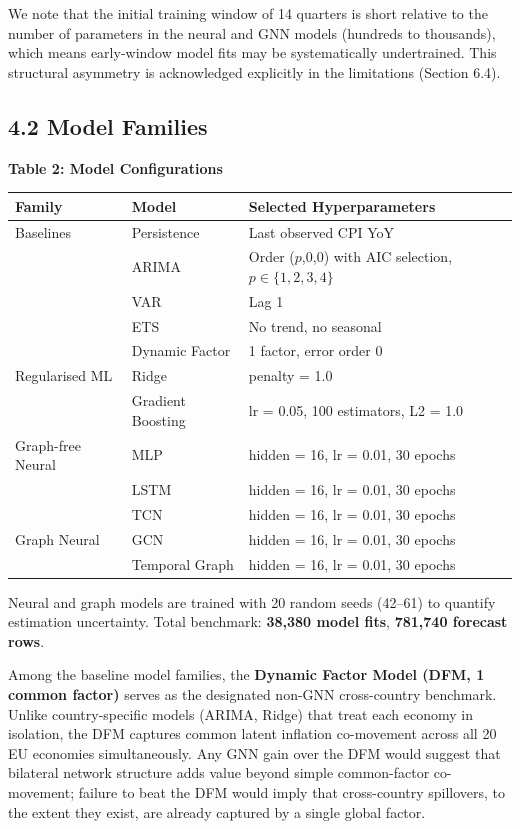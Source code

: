 \documentclass[
]{article}
\newcounter{none} %
\begin{document}
We note that the initial training window of 14 quarters is short
relative to the number of parameters in the neural and GNN models
(hundreds to thousands), which means early-window model fits may be
systematically undertrained. This structural asymmetry is acknowledged
explicitly in the limitations (Section 6.4).

\subsection{4.2 Model Families}\label{model-families}

\textbf{Table 2: Model Configurations}

{\def\LTcaptype{none} %
\begin{longtable}[]{@{}lll@{}}
\toprule\noalign{}
Family & Model & Selected Hyperparameters \\
\midrule\noalign{}
\endhead
\bottomrule\noalign{}
\endlastfoot
Baselines & Persistence & Last observed CPI YoY \\
& ARIMA & Order ($p$,0,0) with AIC selection, $p \in \{1,2,3,4\}$ \\
& VAR & Lag 1 \\
& ETS & No trend, no seasonal \\
& Dynamic Factor & 1 factor, error order 0 \\
Regularised ML & Ridge & penalty = 1.0 \\
& Gradient Boosting & lr = 0.05, 100 estimators, L2 = 1.0 \\
Graph-free Neural & MLP & hidden = 16, lr = 0.01, 30 epochs \\
& LSTM & hidden = 16, lr = 0.01, 30 epochs \\
& TCN & hidden = 16, lr = 0.01, 30 epochs \\
Graph Neural & GCN & hidden = 16, lr = 0.01, 30 epochs \\
& Temporal Graph & hidden = 16, lr = 0.01, 30 epochs \\
\end{longtable}
}

Neural and graph models are trained with 20 random seeds (42--61) to
quantify estimation uncertainty. Total benchmark: \textbf{38,380 model
fits}, \textbf{781,740 forecast rows}.

Among the baseline model families, the \textbf{Dynamic Factor Model (DFM, 1 common factor)} serves as the designated non-GNN cross-country benchmark. Unlike country-specific models (ARIMA, Ridge) that treat each economy in isolation, the DFM captures common latent inflation co-movement across all 20 EU economies simultaneously. Any GNN gain over the DFM would suggest that bilateral network structure adds value beyond simple common-factor co-movement; failure to beat the DFM would imply that cross-country spillovers, to the extent they exist, are already captured by a single global factor.
\end{document}
